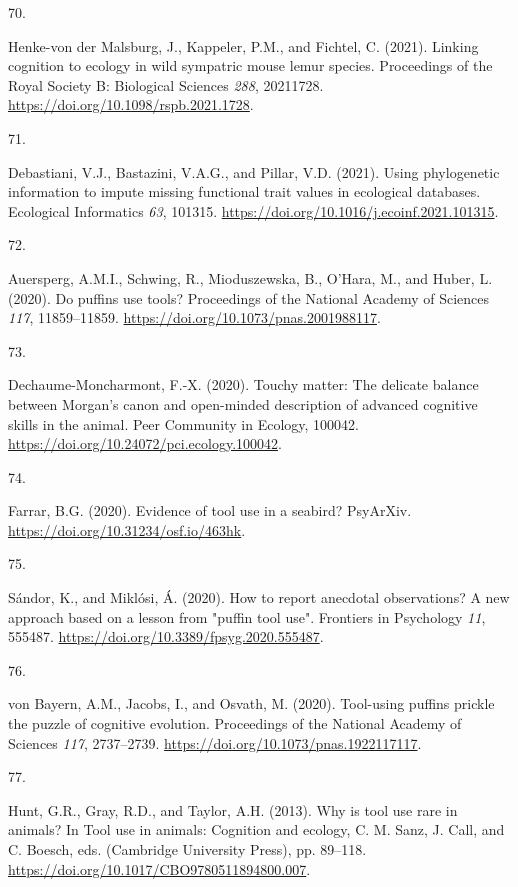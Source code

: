 \documentclass[
  man, donotrepeattitle,floatsintext]{apa6}
\newlength{\cslhangindent}
\newlength{\csllabelwidth}
\newlength{\cslentryspacingunit} %
\newenvironment{CSLReferences}[2] %
 {%
  \setlength{\parindent}{0pt}
  \ifodd #1
  \let\oldpar\par
  \def\par{\hangindent=\cslhangindent\oldpar}
  \fi
  \setlength{\parskip}{#2\cslentryspacingunit}
 }%
 {}
\newcommand{\CSLLeftMargin}[1]{\parbox[t]{\csllabelwidth}{#1}}
\newcommand{\CSLRightInline}[1]{\parbox[t]{\linewidth - \csllabelwidth}{#1}\break}
\begin{document}
\begin{CSLReferences}{0}{0}
\leavevmode{}%
\CSLLeftMargin{70. }%
\CSLRightInline{Henke-von der Malsburg, J., Kappeler, P.M., and Fichtel, C. (2021). Linking cognition to ecology in wild sympatric mouse lemur species. Proceedings of the Royal Society B: Biological Sciences \emph{288}, 20211728. \url{https://doi.org/10.1098/rspb.2021.1728}.}

\leavevmode{}%
\CSLLeftMargin{71. }%
\CSLRightInline{Debastiani, V.J., Bastazini, V.A.G., and Pillar, V.D. (2021). Using phylogenetic information to impute missing functional trait values in ecological databases. Ecological Informatics \emph{63}, 101315. \url{https://doi.org/10.1016/j.ecoinf.2021.101315}.}

\leavevmode{}%
\CSLLeftMargin{72. }%
\CSLRightInline{Auersperg, A.M.I., Schwing, R., Mioduszewska, B., O'Hara, M., and Huber, L. (2020). Do puffins use tools? Proceedings of the National Academy of Sciences \emph{117}, 11859--11859. \url{https://doi.org/10.1073/pnas.2001988117}.}

\leavevmode{}%
\CSLLeftMargin{73. }%
\CSLRightInline{Dechaume-Moncharmont, F.-X. (2020). Touchy matter: The delicate balance between {M}organ's canon and open-minded description of advanced cognitive skills in the animal. Peer Community in Ecology, 100042. \url{https://doi.org/10.24072/pci.ecology.100042}.}

\leavevmode{}%
\CSLLeftMargin{74. }%
\CSLRightInline{Farrar, B.G. (2020). Evidence of tool use in a seabird? PsyArXiv. \url{https://doi.org/10.31234/osf.io/463hk}.}

\leavevmode{}%
\CSLLeftMargin{75. }%
\CSLRightInline{Sándor, K., and Miklósi, Á. (2020). How to report anecdotal observations? A new approach based on a lesson from "puffin tool use". Frontiers in Psychology \emph{11}, 555487. \url{https://doi.org/10.3389/fpsyg.2020.555487}.}

\leavevmode{}%
\CSLLeftMargin{76. }%
\CSLRightInline{von Bayern, A.M., Jacobs, I., and Osvath, M. (2020). Tool-using puffins prickle the puzzle of cognitive evolution. Proceedings of the National Academy of Sciences \emph{117}, 2737--2739. \url{https://doi.org/10.1073/pnas.1922117117}.}

\leavevmode{}%
\CSLLeftMargin{77. }%
\CSLRightInline{Hunt, G.R., Gray, R.D., and Taylor, A.H. (2013). Why is tool use rare in animals? In Tool use in animals: Cognition and ecology, C. M. Sanz, J. Call, and C. Boesch, eds. (Cambridge University Press), pp. 89--118. \url{https://doi.org/10.1017/CBO9780511894800.007}.}


\end{CSLReferences}
\end{document}
